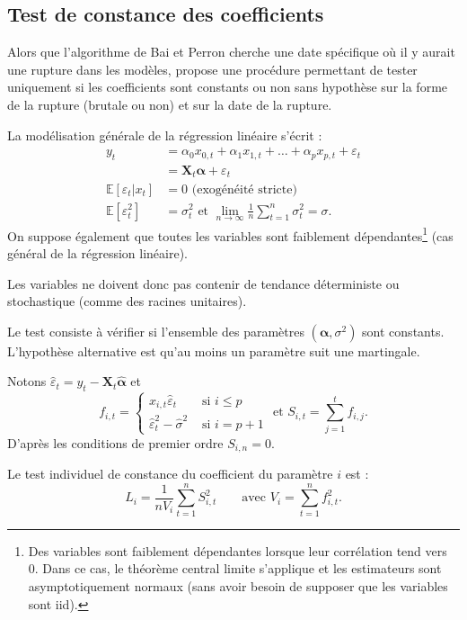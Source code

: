 \documentclass[
  a4paper,
  DIV=11,
  numbers=noendperiod,
  french]{scrartcl}
\newcommand\1{{\mathds 1}}
\newcommand{\bf}[1]{{\boldsymbol #1}}
\newcommand{\E}[1]{\mathbb{E}\left[#1\right]}
\theoremstyle{remark}
\begin{document}
\subsection{Test de constance des coefficients}\label{sec-hansen-test}

Alors que l'algorithme de Bai et Perron cherche une date spécifique où
il y aurait une rupture dans les modèles, \textcite{hansen1992testing}
propose une procédure permettant de tester uniquement si les
coefficients sont constants ou non sans hypothèse sur la forme de la
rupture (brutale ou non) et sur la date de la rupture.

La modélisation générale de la régression linéaire s'écrit :
\begin{align*}
y_t&=\alpha_{0}x_{0,t}+\alpha_{1} x_{1,t}+\dots+\alpha_{p} x_{p,t} +\varepsilon_t  \\
&= {\bf X_t} \bf\alpha  +\varepsilon_t\\
\E{\varepsilon_t|x_t}&=0 \text{ (exogénéité stricte)} \\
\E{\varepsilon_t^2}&=\sigma_t^2\text{ et } \underset{n\to\infty}{\lim}\frac{1}{n}\sum_{t=1}^n\sigma_t^2=\sigma.
\end{align*} On suppose également que toutes les variables sont
faiblement dépendantes\footnote{ Des variables sont faiblement
  dépendantes lorsque leur corrélation tend vers 0. Dans ce cas, le
  théorème central limite s'applique et les estimateurs sont
  asymptotiquement normaux (sans avoir besoin de supposer que les
  variables sont iid).} (cas général de la régression linéaire).

Les variables ne doivent donc pas contenir de tendance déterministe ou
stochastique (comme des racines unitaires).

Le test consiste à vérifier si l'ensemble des paramètres
\((\bf \alpha,\sigma^2)\) sont constants. L'hypothèse alternative est
qu'au moins un paramètre suit une martingale.

Notons \({\hat \varepsilon}_t =y_t- {\bf X_t} \hat{\bf\alpha}\) et \[
f_{i,t} = \begin{cases}
x_{i,t}\hat \varepsilon_t &\text{ si }i\leq p\\
\hat \varepsilon_t^2 - \hat \sigma^2&\text{ si }i=p+1
\end{cases}
\text{ et }S_{i,t} = \sum_{j=1}^tf_{i,j}.
\] D'après les conditions de premier ordre \(S_{i,n}=0.\)

Le test individuel de constance du coefficient du paramètre \(i\) est :
\[
L_i=\frac{1}{nV_i}\sum_{t=1}^nS_{i,t}^2\qquad
\text{avec }V_i=\sum_{t=1}^nf_{i,t}^2.
\]
\end{document}
